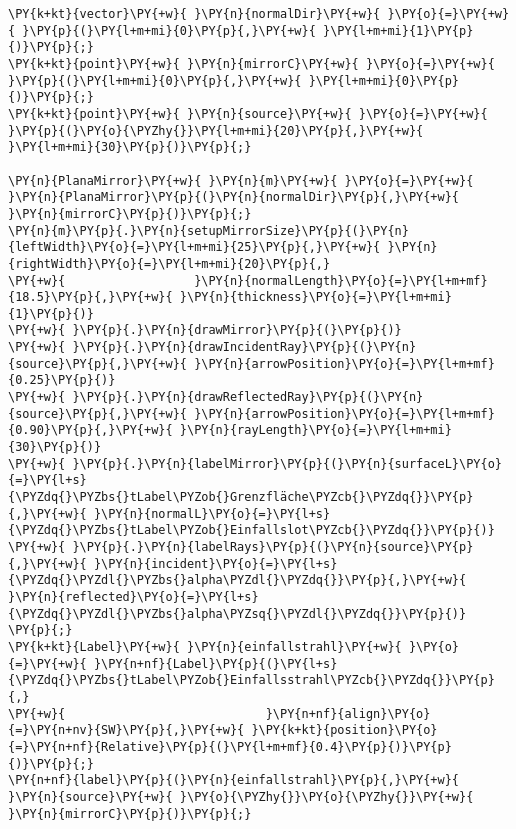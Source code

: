 \begin{Verbatim}[commandchars=\\\{\}]
\PY{k+kt}{vector}\PY{+w}{ }\PY{n}{normalDir}\PY{+w}{ }\PY{o}{=}\PY{+w}{ }\PY{p}{(}\PY{l+m+mi}{0}\PY{p}{,}\PY{+w}{ }\PY{l+m+mi}{1}\PY{p}{)}\PY{p}{;}
\PY{k+kt}{point}\PY{+w}{ }\PY{n}{mirrorC}\PY{+w}{ }\PY{o}{=}\PY{+w}{ }\PY{p}{(}\PY{l+m+mi}{0}\PY{p}{,}\PY{+w}{ }\PY{l+m+mi}{0}\PY{p}{)}\PY{p}{;}
\PY{k+kt}{point}\PY{+w}{ }\PY{n}{source}\PY{+w}{ }\PY{o}{=}\PY{+w}{ }\PY{p}{(}\PY{o}{\PYZhy{}}\PY{l+m+mi}{20}\PY{p}{,}\PY{+w}{ }\PY{l+m+mi}{30}\PY{p}{)}\PY{p}{;}

\PY{n}{PlanaMirror}\PY{+w}{ }\PY{n}{m}\PY{+w}{ }\PY{o}{=}\PY{+w}{ }\PY{n}{PlanaMirror}\PY{p}{(}\PY{n}{normalDir}\PY{p}{,}\PY{+w}{ }\PY{n}{mirrorC}\PY{p}{)}\PY{p}{;}
\PY{n}{m}\PY{p}{.}\PY{n}{setupMirrorSize}\PY{p}{(}\PY{n}{leftWidth}\PY{o}{=}\PY{l+m+mi}{25}\PY{p}{,}\PY{+w}{ }\PY{n}{rightWidth}\PY{o}{=}\PY{l+m+mi}{20}\PY{p}{,}
\PY{+w}{                  }\PY{n}{normalLength}\PY{o}{=}\PY{l+m+mf}{18.5}\PY{p}{,}\PY{+w}{ }\PY{n}{thickness}\PY{o}{=}\PY{l+m+mi}{1}\PY{p}{)}
\PY{+w}{ }\PY{p}{.}\PY{n}{drawMirror}\PY{p}{(}\PY{p}{)}
\PY{+w}{ }\PY{p}{.}\PY{n}{drawIncidentRay}\PY{p}{(}\PY{n}{source}\PY{p}{,}\PY{+w}{ }\PY{n}{arrowPosition}\PY{o}{=}\PY{l+m+mf}{0.25}\PY{p}{)}
\PY{+w}{ }\PY{p}{.}\PY{n}{drawReflectedRay}\PY{p}{(}\PY{n}{source}\PY{p}{,}\PY{+w}{ }\PY{n}{arrowPosition}\PY{o}{=}\PY{l+m+mf}{0.90}\PY{p}{,}\PY{+w}{ }\PY{n}{rayLength}\PY{o}{=}\PY{l+m+mi}{30}\PY{p}{)}
\PY{+w}{ }\PY{p}{.}\PY{n}{labelMirror}\PY{p}{(}\PY{n}{surfaceL}\PY{o}{=}\PY{l+s}{\PYZdq{}\PYZbs{}tLabel\PYZob{}Grenzfläche\PYZcb{}\PYZdq{}}\PY{p}{,}\PY{+w}{ }\PY{n}{normalL}\PY{o}{=}\PY{l+s}{\PYZdq{}\PYZbs{}tLabel\PYZob{}Einfallslot\PYZcb{}\PYZdq{}}\PY{p}{)}
\PY{+w}{ }\PY{p}{.}\PY{n}{labelRays}\PY{p}{(}\PY{n}{source}\PY{p}{,}\PY{+w}{ }\PY{n}{incident}\PY{o}{=}\PY{l+s}{\PYZdq{}\PYZdl{}\PYZbs{}alpha\PYZdl{}\PYZdq{}}\PY{p}{,}\PY{+w}{ }\PY{n}{reflected}\PY{o}{=}\PY{l+s}{\PYZdq{}\PYZdl{}\PYZbs{}alpha\PYZsq{}\PYZdl{}\PYZdq{}}\PY{p}{)}
\PY{p}{;}
\PY{k+kt}{Label}\PY{+w}{ }\PY{n}{einfallstrahl}\PY{+w}{ }\PY{o}{=}\PY{+w}{ }\PY{n+nf}{Label}\PY{p}{(}\PY{l+s}{\PYZdq{}\PYZbs{}tLabel\PYZob{}Einfallsstrahl\PYZcb{}\PYZdq{}}\PY{p}{,}
\PY{+w}{                            }\PY{n+nf}{align}\PY{o}{=}\PY{n+nv}{SW}\PY{p}{,}\PY{+w}{ }\PY{k+kt}{position}\PY{o}{=}\PY{n+nf}{Relative}\PY{p}{(}\PY{l+m+mf}{0.4}\PY{p}{)}\PY{p}{)}\PY{p}{;}
\PY{n+nf}{label}\PY{p}{(}\PY{n}{einfallstrahl}\PY{p}{,}\PY{+w}{ }\PY{n}{source}\PY{+w}{ }\PY{o}{\PYZhy{}}\PY{o}{\PYZhy{}}\PY{+w}{ }\PY{n}{mirrorC}\PY{p}{)}\PY{p}{;}


\end{Verbatim}
